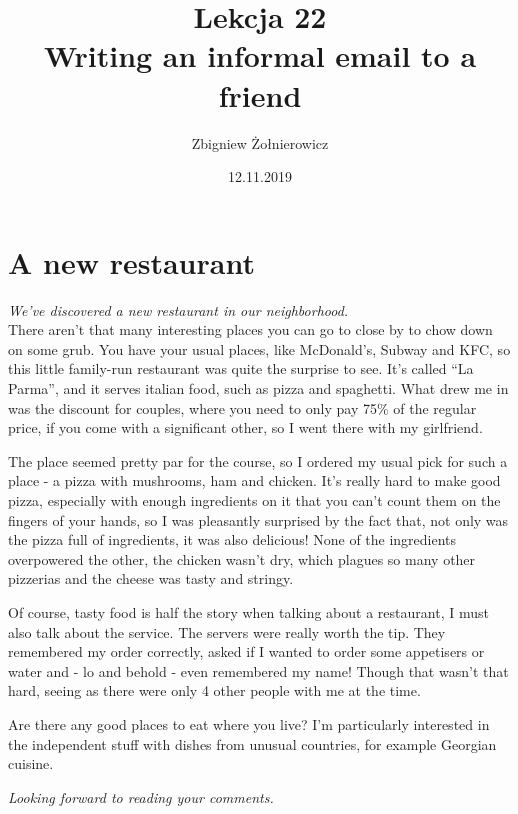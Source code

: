 \documentclass[a4paper]{article}
\begin{document}
\title{{\huge Lekcja 22} \\
{\large Writing an informal email to a friend}}
\author{Zbigniew Żołnierowicz}
\date{12.11.2019}
\maketitle
\section{A new restaurant}
\emph{We've discovered a new restaurant in our neighborhood.}\\
There aren't that many interesting places you can go to close by to chow down on some grub.
You have your usual places, like McDonald's, Subway and KFC, so this little family-run restaurant was quite the surprise to see.
It's called ``La Parma'', and it serves italian food, such as pizza and spaghetti.
What drew me in was the discount for couples, where you need to only pay 75\% of the regular price, if you come with a significant other, so I went there with my girlfriend.

The place seemed pretty par for the course, so I ordered my usual pick for such a place - a pizza with mushrooms, ham and chicken.
It's really hard to make good pizza, especially with enough ingredients on it that you can't count them on the fingers of your hands,
so I was pleasantly surprised by the fact that, not only was the pizza full of ingredients, it was also delicious!
None of the ingredients overpowered the other, the chicken wasn't dry, which plagues so many other pizzerias and the cheese was tasty and stringy.

Of course, tasty food is half the story when talking about a restaurant, I must also talk about the service.
The servers were really worth the tip. They remembered my order correctly, asked if I wanted to order some appetisers or water and - lo and behold - even remembered my name!
Though that wasn't that hard, seeing as there were only 4 other people with me at the time.

Are there any good places to eat where you live? I'm particularly interested in the independent stuff with dishes from unusual countries, for example Georgian cuisine.

\emph{Looking forward to reading your comments.}
\end{document}
